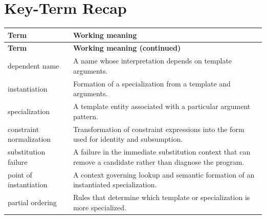\documentclass[11pt,letterpaper]{article}
\begin{document}
\section{Key-Term Recap}
\begin{longtable}{@{}>{\RaggedRight\arraybackslash}p{}>{\RaggedRight\arraybackslash}p{}@{}}\toprule\textbf{Term} & \textbf{Working meaning}\\\midrule\endfirsthead\toprule\textbf{Term} & \textbf{Working meaning (continued)}\\\midrule\endhead\bottomrule\endfoot
dependent name & A name whose interpretation depends on template arguments.\\
instantiation & Formation of a specialization from a template and arguments.\\
specialization & A template entity associated with a particular argument pattern.\\
constraint normalization & Transformation of constraint expressions into the form used for identity and subsumption.\\
substitution failure & A failure in the immediate substitution context that can remove a candidate rather than diagnose the program.\\
point of instantiation & A context governing lookup and semantic formation of an instantiated specialization.\\
partial ordering & Rules that determine which template or specialization is more specialized.\\
\end{longtable}
\end{document}
